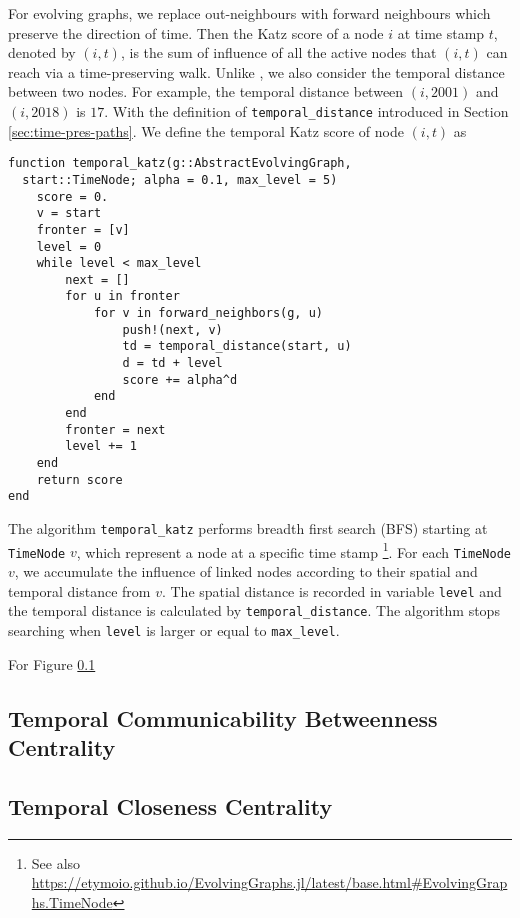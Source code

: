 \documentclass[12pt]{article}
\theoremstyle{definition}
\begin{document}
For evolving graphs, we replace out-neighbours with forward neighbours which preserve the direction of time.
Then the Katz score of a node $i$ at time stamp $t$, denoted by $(i,t)$, is the sum of influence of all the active nodes that $(i,t)$ can reach via a time-preserving walk.
Unlike \cite{grindrod11}, we also consider the temporal distance between two nodes. For example, the temporal distance between $(i, 2001)$ and $(i, 2018)$ is $17$.
With the definition of \texttt{temporal\_distance} introduced in Section \ref{sec:time-pres-paths}.
We define the temporal Katz score of node $(i, t)$ as

\begin{lstlisting}
function temporal_katz(g::AbstractEvolvingGraph,
  start::TimeNode; alpha = 0.1, max_level = 5)
    score = 0.
    v = start
    fronter = [v]
    level = 0
    while level < max_level
        next = []
        for u in fronter
            for v in forward_neighbors(g, u)
                push!(next, v)
                td = temporal_distance(start, u)
                d = td + level
                score += alpha^d
            end
        end
        fronter = next
        level += 1
    end
    return score
end
\end{lstlisting}

The algorithm \texttt{temporal\_katz} performs breadth first search (BFS) starting at \texttt{TimeNode} $v$, which represent a node at a specific time stamp \footnote{See also \url{https://etymoio.github.io/EvolvingGraphs.jl/latest/base.html#EvolvingGraphs.TimeNode}}.
For each \texttt{TimeNode} $v$, we accumulate the influence of linked nodes according to their spatial and temporal
distance from $v$. The spatial distance is recorded in variable \texttt{level} and the temporal distance is calculated by
\texttt{temporal\_distance}. The algorithm stops searching when \texttt{level} is larger or equal to \texttt{max\_level}.

For Figure \ref{}



\subsection{Temporal Communicability Betweenness Centrality}


\subsection{Temporal Closeness Centrality}
\label{sec:temp-betw-centr}
\end{document}
